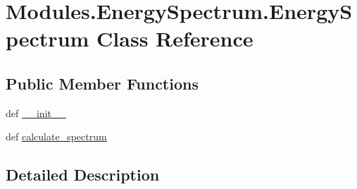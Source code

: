 \hypertarget{classModules_1_1EnergySpectrum_1_1EnergySpectrum}{\section{Modules.\-Energy\-Spectrum.\-Energy\-Spectrum Class Reference}
\label{classModules_1_1EnergySpectrum_1_1EnergySpectrum}
}
\subsection*{Public Member Functions}
\begin{DoxyCompactItemize}
\item 
def \hyperlink{classModules_1_1EnergySpectrum_1_1EnergySpectrum_adeebb674fa3fd402b87abcfe488762d6}{\-\_\-\-\_\-init\-\_\-\-\_\-}
\item 
def \hyperlink{classModules_1_1EnergySpectrum_1_1EnergySpectrum_a97d5455f817511e122cb9451e65ce3c8}{calculate\-\_\-spectrum}
\end{DoxyCompactItemize}


\subsection{Detailed Description}
\begin{DoxyVerb}\end{DoxyVerb}
 

